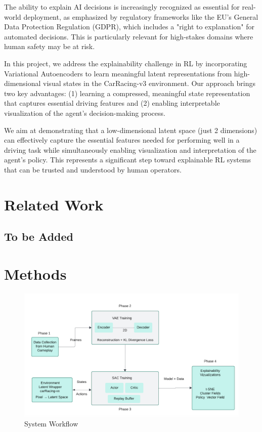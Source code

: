 \documentclass[conference]{IEEEtran}
\begin{document}
The ability to explain AI decisions is increasingly recognized as essential for real-world deployment, as emphasized by regulatory frameworks like the EU's General Data Protection Regulation (GDPR), which includes a "right to explanation" for automated decisions. This is particularly relevant for high-stakes domains where human safety may be at risk.

In this project, we address the explainability challenge in RL by incorporating Variational Autoencoders to learn meaningful latent representations from high-dimensional visual states in the CarRacing-v3 environment. Our approach brings two key advantages: (1) learning a compressed, meaningful state representation that captures essential driving features and (2) enabling interpretable visualization of the agent's decision-making process.

We aim at demonstrating that a low-dimensional latent space (just 2 dimensions) can effectively capture the essential features needed for performing well in a driving task while simultaneously enabling visualization and interpretation of the agent's policy. This represents a significant step toward explainable RL systems that can be trusted and understood by human operators.

\section{Related Work}

\subsection{To be Added}


\section{Methods}
\begin{figure}[H]
    \centering
    \includegraphics[width=0.75\linewidth]{Writeup/system-overview.png}
    \caption{System Workflow}
    \label{fig:System Architecture}
\end{figure}
\end{document}
